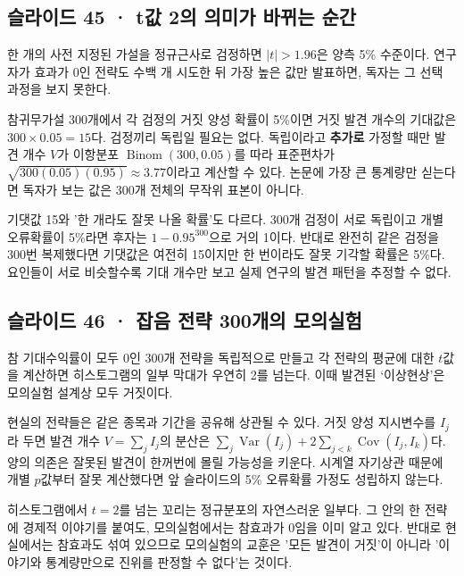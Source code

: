 \documentclass[11pt,a4paper]{article}
\begin{document}
\subsection{슬라이드 45 · t값 2의 의미가 바뀌는 순간}
한 개의 사전 지정된 가설을 정규근사로 검정하면 $|t|>1.96$은 양측 5\% 수준이다. 연구자가 효과가 0인 전략도 수백 개 시도한 뒤 가장 높은 값만 발표하면, 독자는 그 선택 과정을 보지 못한다.\par

참귀무가설 300개에서 각 검정의 거짓 양성 확률이 5\%이면 거짓 발견 개수의 기대값은 $300\times0.05=15$다. 검정끼리 독립일 필요는 없다. 독립이라고 \textbf{추가로} 가정할 때만 발견 개수 $V$가 이항분포 $\operatorname{Binom}(300,0.05)$를 따라 표준편차가 $\sqrt{300(0.05)(0.95)}\approx3.77$이라고 계산할 수 있다. 논문에 가장 큰 통계량만 싣는다면 독자가 보는 값은 300개 전체의 무작위 표본이 아니다.\par

기댓값 15와 '한 개라도 잘못 나올 확률'도 다르다. 300개 검정이 서로 독립이고 개별 오류확률이 5\%라면 후자는 $1-0.95^{300}$으로 거의 1이다. 반대로 완전히 같은 검정을 300번 복제했다면 기댓값은 여전히 15이지만 한 번이라도 잘못 기각할 확률은 5\%다. 요인들이 서로 비슷할수록 기대 개수만 보고 실제 연구의 발견 패턴을 추정할 수 없다.\par

\subsection{슬라이드 46 · 잡음 전략 300개의 모의실험}
참 기대수익률이 모두 0인 300개 전략을 독립적으로 만들고 각 전략의 평균에 대한 $t$값을 계산하면 히스토그램의 일부 막대가 우연히 2를 넘는다. 이때 발견된 ‘이상현상’은 모의실험 설계상 모두 거짓이다.\par

현실의 전략들은 같은 종목과 기간을 공유해 상관될 수 있다. 거짓 양성 지시변수를 $I_j$라 두면 발견 개수 $V=\sum_jI_j$의 분산은 $\sum_j\operatorname{Var}(I_j)+2\sum_{j<k}\operatorname{Cov}(I_j,I_k)$다. 양의 의존은 잘못된 발견이 한꺼번에 몰릴 가능성을 키운다. 시계열 자기상관 때문에 개별 $p$값부터 잘못 계산했다면 앞 슬라이드의 5\% 오류확률 가정도 성립하지 않는다.\par

히스토그램에서 $t=2$를 넘는 꼬리는 정규분포의 자연스러운 일부다. 그 안의 한 전략에 경제적 이야기를 붙여도, 모의실험에서는 참효과가 0임을 이미 알고 있다. 반대로 현실에서는 참효과도 섞여 있으므로 모의실험의 교훈은 '모든 발견이 거짓'이 아니라 '이야기와 통계량만으로 진위를 판정할 수 없다'는 것이다.\par
\end{document}
